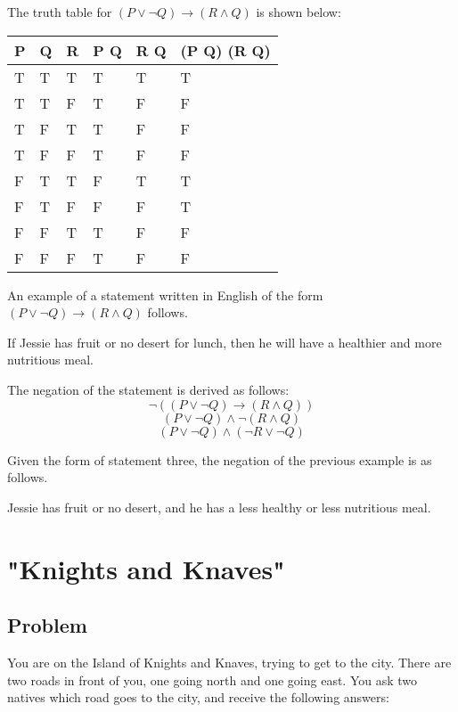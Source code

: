\documentclass{article}
\begin{document}
The truth table for $ (P \lor \lnot Q) \rightarrow (R \land Q) $ is shown below:
\begin{center}
	\begin{tabular}{ L L L | L | L | L }
		P & Q & R &
			P \land \lnot Q & 
			R \land Q &
			(P \lor \lnot Q) \rightarrow (R \land Q)
		\\
		\hline
		T & T & T & T & T & T \\ 
		T & T & F & T & F & F \\  
		T & F & T & T & F & F \\
		T & F & F & T & F & F \\
		F & T & T & F & T & T \\ 
		F & T & F & F & F & T \\  
		F & F & T & T & F & F \\
		F & F & F & T & F & F 
	\end{tabular}
\end{center}

An example of a statement written in English of the form $ (P \lor \lnot Q) \rightarrow (R \land Q) $ follows. 

If Jessie has fruit or no desert for lunch, then he will have a healthier and more nutritious meal. 

The negation of the statement is derived as follows:
\begin{equation}
	\lnot((P \lor \lnot Q) \rightarrow (R \land Q))
\end{equation}
\begin{equation}
	(P \lor \lnot Q) \land \lnot (R \land Q)
\end{equation}
\begin{equation}
	(P \lor \lnot Q) \land (\lnot R \lor \lnot Q)
\end{equation}

Given the form of statement three, the negation of the previous example is as follows. 

Jessie has fruit or no desert, and he has a less healthy or less nutritious meal.


\newpage
\section{"Knights and Knaves"}
\subsection{Problem}
You are on the Island of Knights and Knaves, trying to get to the city. There are two roads in front of you, one going north and one going east. You ask two natives which road goes to the city, and receive the following answers:
\end{document}
